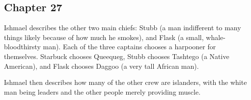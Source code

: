 \subsection{Chapter 27}

Ishmael describes the other two main chiefs: Stubb (a man indifferent to many
things likely because of how much he smokes), and Flask (a small,
whale-bloodthirsty man). Each of the three captains chooses a harpooner for
themselves. Starbuck chooses Queequeg, Stubb chooses Tashtego (a Native
American), and Flask chooses Daggoo (a very tall African man).

Ishmael then describes how many of the other crew are islanders, with the white
man being leaders and the other people merely providing muscle.
